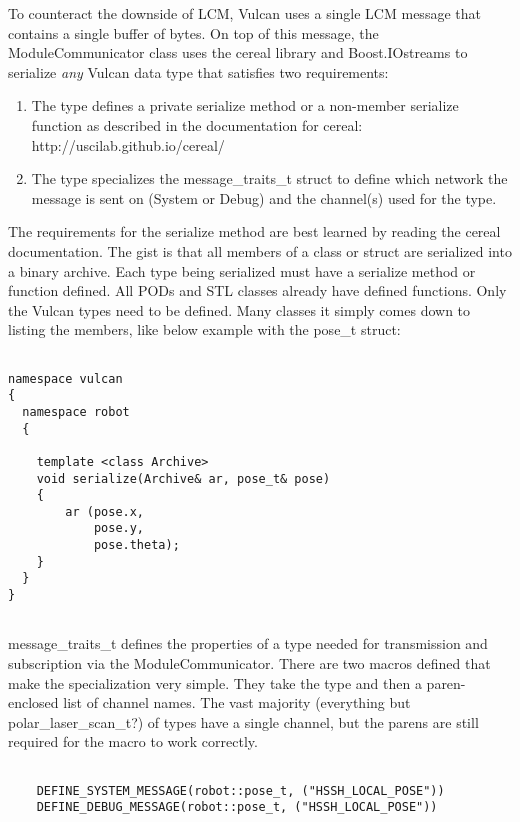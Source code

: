 \documentclass{article}
\begin{document}
To counteract the downside of LCM, Vulcan uses a single LCM message that contains a single buffer of bytes. On top of 
this message, the ModuleCommunicator class uses the cereal library and Boost.IOstreams to serialize \emph{any} Vulcan 
data type that satisfies two requirements:

\begin{enumerate}
 \item The type defines a private serialize method or a non-member serialize function as described in the documentation 
  for cereal: http://uscilab.github.io/cereal/ 
  
  \item The type specializes the message\_traits\_t struct to define which 
  network the message is sent on (System or Debug) and the channel(s) used for the type.
\end{enumerate}

The requirements for the serialize method are best learned by reading the cereal documentation. The gist is that all 
members of a class or struct are serialized into a binary archive. Each type being serialized must have a serialize 
method or function defined. All PODs and STL classes already have defined functions. Only the Vulcan types need to be 
defined. Many classes it simply comes down to listing the members, like below example with the pose\_t struct:

\begin{verbatim}

namespace vulcan
{
  namespace robot
  {
    
    template <class Archive>
    void serialize(Archive& ar, pose_t& pose)
    {
        ar (pose.x,
            pose.y,
            pose.theta);
    }
  }
}
    
\end{verbatim}

message\_traits\_t defines the properties of a type needed for transmission and subscription via the ModuleCommunicator. 
There are two macros defined that make the specialization very simple. They take the type and then a paren-enclosed list 
of channel names. The vast majority (everything but polar\_laser\_scan\_t?) of types have a single channel, but the 
parens are still required for the macro to work correctly.

\begin{verbatim}
   
    DEFINE_SYSTEM_MESSAGE(robot::pose_t, ("HSSH_LOCAL_POSE"))
    DEFINE_DEBUG_MESSAGE(robot::pose_t, ("HSSH_LOCAL_POSE"))
    
\end{verbatim}
\end{document}
